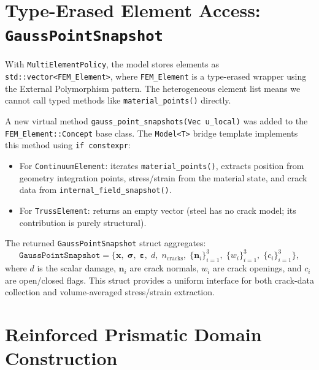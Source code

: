 \section{Type-Erased Element Access: \texttt{GaussPointSnapshot}}
\label{sec:mixed-gauss-snapshot}

With \texttt{MultiElementPolicy}, the model stores elements as
\texttt{std::vector<FEM\_Element>}, where \texttt{FEM\_Element} is a
type-erased wrapper using the External Polymorphism pattern.  The
heterogeneous element list means we cannot call typed methods like
\texttt{material\_points()} directly.

A new virtual method \texttt{gauss\_point\_snapshots(Vec u\_local)} was
added to the \texttt{FEM\_Element::Concept} base class.  The
\texttt{Model<T>} bridge template implements this method using
\texttt{if constexpr}:

\begin{itemize}
  \item For \texttt{ContinuumElement}: iterates \texttt{material\_points()},
    extracts position from geometry integration points, stress/strain from
    the material state, and crack data from
    \texttt{internal\_field\_snapshot()}.
  \item For \texttt{TrussElement}: returns an empty vector (steel has no
    crack model; its contribution is purely structural).
\end{itemize}

The returned \texttt{GaussPointSnapshot} struct aggregates:
\begin{equation*}
  \texttt{GaussPointSnapshot} = \bigl\{
    \mathbf{x}, \;
    \boldsymbol{\sigma}, \;
    \boldsymbol{\varepsilon}, \;
    d, \;
    n_{\text{cracks}}, \;
    \{\mathbf{n}_i\}_{i=1}^3, \;
    \{w_i\}_{i=1}^3, \;
    \{c_i\}_{i=1}^3
  \bigr\},
\end{equation*}
where $d$ is the scalar damage, $\mathbf{n}_i$ are crack normals,
$w_i$ are crack openings, and $c_i$ are open/closed flags.  This
struct provides a uniform interface for both crack-data collection
and volume-averaged stress/strain extraction.


\section{Reinforced Prismatic Domain Construction}
\label{sec:mixed-domain}

